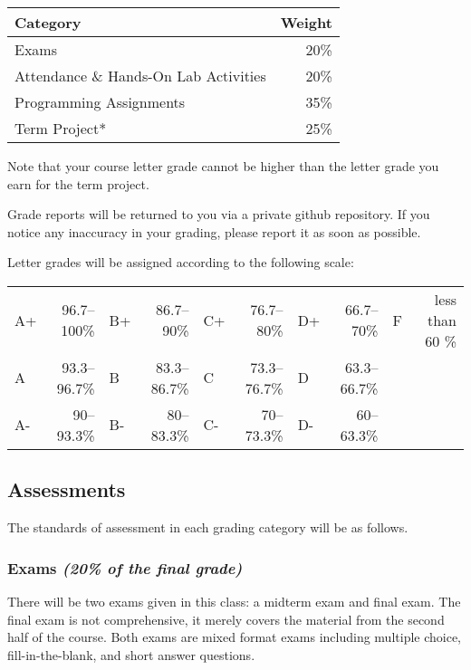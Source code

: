 \documentclass[11pt]{article}
\begin{document}
\begin{tabular}{|l|r|}
\hline
{\bf Category} & {\bf Weight}\\
\hline
Exams & 20\%\\
\hline
Attendance \& Hands-On Lab Activities & 20\% \\
\hline
Programming Assignments & 35\%\\
\hline
Term Project* & 25\% \\
\hline
\end{tabular}

{\footnotesize * Note that your course letter grade cannot be higher
than the letter grade you earn for the term project.}

\vspace{0.25in}

Grade reports will be returned to you via a private github
repository.  If you notice any inaccuracy in your grading, please
report it as soon as possible.  

\vspace{0.25in}

Letter grades will be assigned according to the following scale:

\begin{tabular}{|lr|lr|lr|lr|lr|}
    \hline
    A+ & 96.7--100\% & B+ & 86.7--90\% & C+ & 76.7--80\% & D+ & 66.7--70\% & F & less than 60 \% \\
    A  & 93.3--96.7\% & B & 83.3--86.7\% & C & 73.3--76.7\% & D & 63.3--66.7\% & & \\
    A- & 90--93.3\% & B- & 80--83.3\% & C- & 70--73.3\% & D- & 60--63.3\% & & \\
    \hline
\end{tabular}

\subsection*{Assessments}
The standards of assessment in each grading category will be as
follows.

\subsubsection*{Exams {\em (20\% of the final grade)}}
There will be two exams given in this class: a midterm exam and final
exam.  The final exam is not comprehensive, it merely covers the
material from the second half of the course. Both exams are mixed
format exams including multiple choice, fill-in-the-blank, and short
answer questions.
\end{document}
